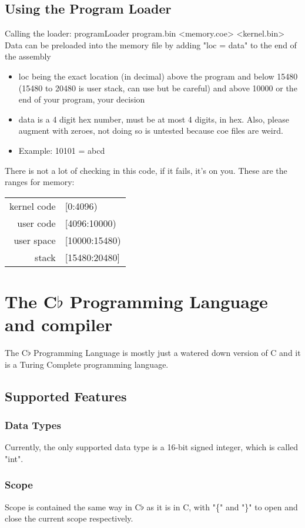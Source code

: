 	\subsection{Using the Program Loader}
		Calling the loader:  programLoader program.bin <memory.coe> <kernel.bin>\\
		Data can be preloaded into the memory file by adding "loc = data" to the end of the assembly
		\begin{itemize}
			\item loc being the exact location (in decimal) above the program and below 15480 (15480 to 20480 is user stack, can use but be careful) and above 10000 or the end of your program, your decision
			\item data is a 4 digit hex number, must be at most 4 digits, in hex.  Also, please augment with zeroes, not doing so is untested because coe files are weird.
			\item Example:  10101 = abcd
		\end{itemize}
		There is not a lot of checking in this code, if it fails, it's on you.  These are the ranges for memory:
		\begin{center} \begin{tabular}{ r l }
			kernel code & [0:4096) \\
			user code   & [4096:10000) \\
			user space  & [10000:15480) \\
			stack       & [15480:20480] \\
		\end{tabular} \end{center}
\section{The C$\flat$ Programming Language and compiler}
	The C$\flat$ Programming Language is mostly just a watered down version of C and it is a Turing Complete programming language.
	\subsection{Supported Features}
		\subsubsection{Data Types}
			Currently, the only supported data type is a 16-bit signed integer, which is called "int".
		\subsubsection{Scope}
			Scope is contained the same way in C$\flat$ as it is in C, with "\{" and "\}" to open and close the current scope respectively.
